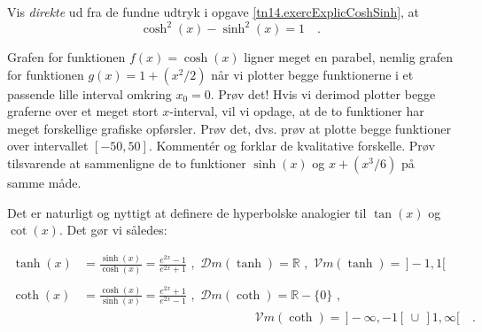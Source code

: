 \begin{exercise}
Vis \emph{direkte} ud fra de fundne udtryk i opgave \ref{tn14.exercExplicCoshSinh}, at
\begin{equation}
\cosh^{2}(x) - \sinh^{2}(x) = 1 \quad.
\end{equation}
\end{exercise}


\begin{exercise}
Grafen for funktionen $f(x) = \cosh(x)$ ligner meget en parabel, nemlig grafen for funktionen $g(x)= 1+ (x^{2}/2)$ når vi plotter begge funktionerne
i et passende lille interval omkring $x_{0}= 0$. Prøv det! Hvis vi derimod plotter begge graferne over et meget stort $x$-interval, vil vi opdage, at de to funktioner har meget forskellige grafiske opførsler. Prøv det, dvs. prøv at plotte begge funktioner over intervallet $[-50, 50]$.  Komment\'{e}r og forklar de kvalitative forskelle. Prøv tilsvarende at sammenligne de to funktioner $\sinh(x)$ og $x + (x^{3}/6)$ på samme måde.
\end{exercise}


Det er naturligt og nyttigt at definere de hyperbolske analogier til $\tan(x)$ og $\cot(x)$. Det gør vi således:

\begin{definition}
\begin{equation}
\begin{aligned}
\tanh(x) &= \frac{\sinh(x)}{\cosh(x)} = \frac{e^{2x} -1}{e^{2x} + 1} \,\, , \,\, \mathcal{D}m(\tanh) = \mathbb{R}\,\,  , \,\,   \mathcal{V}m(\tanh) = \,  ]-1,1[ \\ \\
\coth(x) &= \frac{\cosh(x)}{\sinh(x)} = \frac{e^{2x}+1}{e^{2x} - 1} \,\, , \,\,
\mathcal{D}m(\coth) = \mathbb{R} - \{0\}\, \, , \\ &\phantom{\mathcal{D}m(\coth) = \mathbb{R} \setminus \{0\}\qquad \qquad} \mathcal{V}m(\coth) = \,  ]-\infty, -1[\, \cup\, ]1, \infty[ \quad .
\end{aligned}
\end{equation}
\end{definition}


